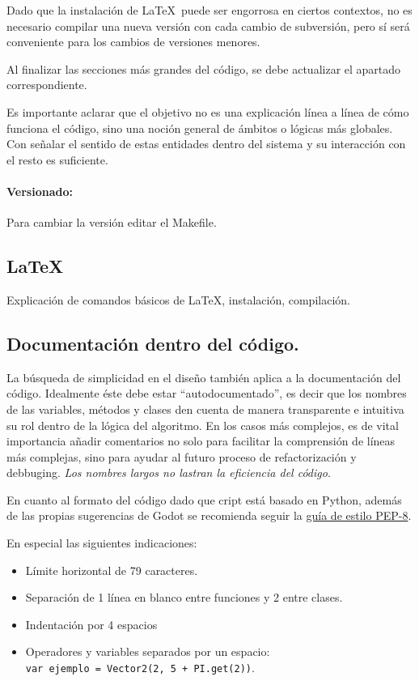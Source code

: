 Dado que la instalación de \LaTeX\ puede ser engorrosa en ciertos contextos, no es necesario compilar una nueva versión con cada cambio de subversión, pero sí será conveniente para los cambios de versiones menores.

Al finalizar las secciones más grandes del código, se debe actualizar el apartado correspondiente.

Es importante aclarar que el objetivo no es una explicación línea a línea de cómo funciona el código, sino una noción general de ámbitos o lógicas más globales. Con señalar el sentido de estas entidades dentro del sistema y su interacción con el resto es suficiente.

\paragraph{Versionado:}
Para cambiar la versión editar el Makefile.

\subsection{LaTeX}
Explicación de comandos básicos de \LaTeX, instalación, compilación. 

\subsection{Documentación dentro del código.}\label{principios:documentacion-en-codigo}
La búsqueda de simplicidad en el diseño también aplica a la documentación del código. Idealmente éste debe estar “autodocumentado”, es decir que los nombres de las variables, métodos y clases den cuenta de manera transparente e intuitiva su rol dentro de la lógica del algoritmo. En los casos más complejos, es de vital importancia añadir comentarios no solo para facilitar la comprensión de líneas más complejas, sino para ayudar al futuro proceso de refactorización y debbuging. \emph{Los nombres largos no lastran la eficiencia del código}.

En cuanto al formato del código dado que cript está basado en Python, además de las propias sugerencias de Godot se recomienda seguir la \href{https://www.python.org/dev/peps/pep-0008/}{guía de estilo PEP-8}.

En especial las siguientes indicaciones:
\begin{itemize}
	\item Límite horizontal de 79 caracteres. 
	\item Separación de 1 línea en blanco entre funciones y 2 entre clases.
	\item Indentación por 4 espacios
	\item Operadores y variables separados por un espacio:\\\small \texttt{var ejemplo = Vector2(2, 5 + PI.get(2))}.
\end{itemize}
